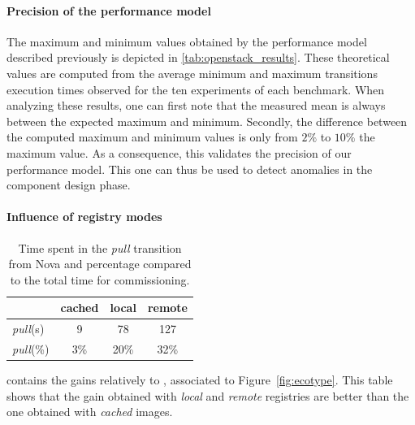 \paragraph{Precision of the performance model}
The maximum and minimum values obtained by the performance model
described previously is depicted in
\cref{tab:openstack_results}. These theoretical values are computed
from the average minimum and maximum transitions execution times
observed for the ten experiments of each benchmark. When analyzing
these results, one can first note that the measured mean is always
between the expected maximum and minimum. Secondly, the difference
between the computed maximum and minimum values is only from $2\%$ to
$10\%$ the maximum value. As a consequence, this validates the
precision of our performance model.  This one can thus be used to
detect anomalies in the component design phase.


\paragraph{Influence of registry modes}

\begin{table}
  \begin{center}
    \begin{tabular}{lccc}
      \toprule
      & cached & local & remote\\
      \midrule
      \emph{pull}(s) & 9 & 78 & 127\\
      \emph{pull}(\%) & 3\% & 20\% & 32\%\\
      \bottomrule
    \end{tabular}
    \caption{Time spent in the \emph{pull} transition from Nova and
    percentage compared to the total time for \ansass commissioning.}
    \label{tab:pull}
  \end{center}
\end{table}

 contains the gains relatively to \ansass,
associated to Figure~\ref{fig:ecotype}. This table shows that the gain
obtained with \emph{local} and \emph{remote} registries are better
than the one obtained with \emph{cached} \docker images.


